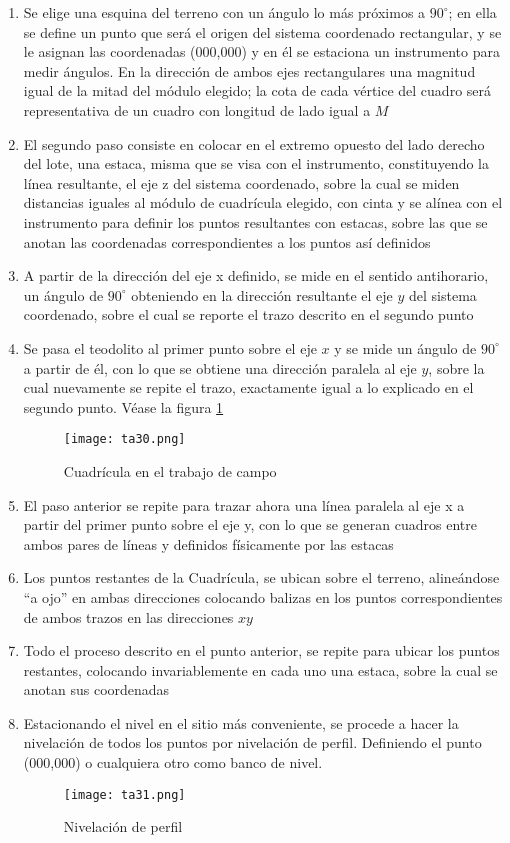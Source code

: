 \begin{enumerate}
    \item Se elige una esquina del terreno con un ángulo lo más próximos a $90^{\circ}$; en ella se define un punto que será el origen del sistema coordenado rectangular, y se le asignan las coordenadas (000,000) y en él se estaciona un instrumento para medir ángulos. En la dirección de ambos ejes rectangulares una magnitud igual de la mitad del módulo elegido; la cota de cada vértice del cuadro será representativa de un cuadro con longitud de lado igual a $M$
    \item El segundo paso consiste en colocar en el extremo opuesto del lado derecho del lote, una estaca, misma que se visa con el instrumento, constituyendo la línea resultante, el eje z del sistema coordenado, sobre la cual se miden distancias iguales al módulo de cuadrícula elegido, con cinta y se alínea con el instrumento para definir los puntos resultantes con estacas, sobre las que se anotan las coordenadas correspondientes a los puntos así definidos
    \item A partir de la dirección del eje x definido, se mide en el sentido antihorario, un ángulo de $90^{\circ}$ obteniendo en la dirección resultante el eje $y$ del sistema coordenado, sobre el cual se reporte el trazo descrito en el segundo punto
    \item Se pasa el teodolito al primer punto sobre el eje $x$ y se mide un ángulo de $90^{\circ}$ a partir de él, con lo que se obtiene una dirección paralela al eje $y$, sobre la cual nuevamente se repite el trazo, exactamente igual a lo explicado en el segundo punto. Véase la figura \ref{ta30} \begin{figure}[h!]
        \centering
          \texttt{[image: ta30.png]}
          \caption{Cuadrícula en el trabajo de campo}
          \label{ta30}
        \end{figure}
    \item El paso anterior se repite para trazar ahora una línea paralela al eje x a partir del primer punto sobre el eje y, con lo que se generan cuadros entre ambos pares de líneas y definidos físicamente por las estacas
    \item Los puntos restantes de la Cuadrícula, se ubican sobre el terreno, alineándose ``a ojo'' en ambas direcciones colocando balizas en los puntos correspondientes de ambos trazos en las direcciones $xy$
    \item Todo el proceso descrito en el punto anterior, se repite para ubicar los puntos restantes, colocando invariablemente en cada uno una estaca, sobre la cual se anotan sus coordenadas
    \item Estacionando el nivel en el sitio más conveniente, se procede a hacer la nivelación de todos los puntos por nivelación de perfil. Definiendo el punto (000,000) o cualquiera otro como banco de nivel.
    \begin{figure}[h!]
        \centering
          \texttt{[image: ta31.png]}
          \caption{Nivelación de perfil}
          \label{ta31}
        \end{figure}
\end{enumerate}


